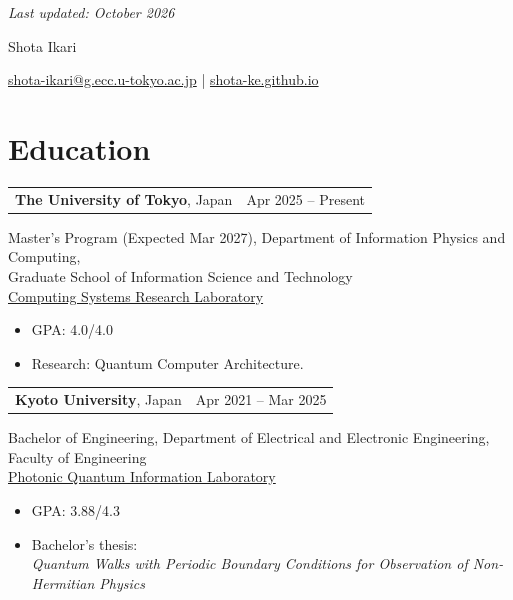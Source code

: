 \documentclass[11pt,a4paper]{article}
\makeatletter
\newenvironment{entry}[2]{%
  \par\addvspace{4pt}\noindent\begin{minipage}{\linewidth}
  \raggedright
  \begin{tabularx}{\linewidth}{@{}>{\raggedright\arraybackslash}X@{\hspace{12pt}}r@{}}
    #1 & #2
  \end{tabularx}\par\vspace{1pt}
}{\end{minipage}\par}
\newenvironment{entrydetails}{%
  \begin{list}{}{\setlength{\leftmargin}{10pt}\setlength{\rightmargin}{0pt}%
    \setlength{\topsep}{0pt}\setlength{\partopsep}{0pt}\setlength{\parsep}{0pt}}\item[]
}{\end{list}}
\makeatother
\begin{document}
\hfill{\small\color{gray}\textit{Last updated: October 2026}}\par
\vspace{4pt}
\begin{center}
  {\fontsize{26pt}{29pt}\selectfont Shota Ikari}\par
  \vspace{4pt}
  \href{mailto:shota-ikari@g.ecc.u-tokyo.ac.jp}{shota-ikari@g.ecc.u-tokyo.ac.jp}
  \enspace|\enspace
  \href{https://shota-ke.github.io/}{shota-ke.github.io}\\[3pt]
\end{center}

\section{Education}
\begin{entry}{\textbf{The University of Tokyo}, Japan}{Apr 2025 -- Present}
  \begin{entrydetails}
  Master's Program (Expected Mar 2027), Department of Information Physics and Computing,\\
  Graduate School of Information Science and Technology\\
  \href{https://hal.ipc.i.u-tokyo.ac.jp/en/}{Computing Systems Research Laboratory}
  \begin{itemize}
    \item GPA: 4.0/4.0
    \item Research: Quantum Computer Architecture.
  \end{itemize}
  \end{entrydetails}
\end{entry}
\begin{entry}{\textbf{Kyoto University}, Japan}{Apr 2021 -- Mar 2025}
  \begin{entrydetails}
  Bachelor of Engineering, Department of Electrical and Electronic Engineering,
  Faculty of Engineering\\
  \href{https://qip.kuee.kyoto-u.ac.jp/en/index.html}{Photonic Quantum Information Laboratory}
  \begin{itemize}
    \item GPA: 3.88/4.3
    \item Bachelor's thesis:\\
      \hspace*{12pt}\textit{Quantum Walks with Periodic Boundary Conditions for Observation of Non-Hermitian Physics}
  \end{itemize}
  \end{entrydetails}
\end{entry}
\end{document}
